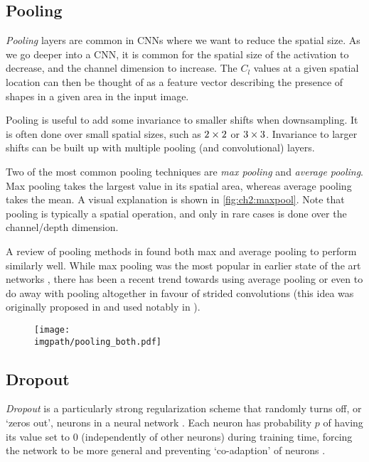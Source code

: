 \subsection{Pooling}
\emph{Pooling} layers are common in CNNs where we want to reduce the spatial size. As
we go deeper into a CNN, it is common for the spatial size of the activation to
decrease, and the channel dimension to increase. The $C_l$ values at a given
spatial location can then be thought of as a feature vector describing the
presence of shapes in a given area in the input image.

Pooling is useful to add some invariance to smaller shifts when downsampling. It
is often done over small spatial sizes, such as $2\times 2$ or $3\times 3$. Invariance
to larger shifts can be built up with multiple pooling (and convolutional) layers.

Two of the most common pooling techniques are \emph{max pooling} and
\emph{average pooling}. Max pooling takes the largest value in its spatial area,
whereas average pooling takes the mean. A visual explanation is shown in 
\autoref{fig:ch2:maxpool}. Note that pooling is typically a spatial operation,
and only in rare cases is done over the channel/depth dimension.

A review of pooling methods in \cite{mishkin_systematic_2016} found both
max and average pooling to perform similarly well. While max pooling was the most
popular in earlier state of the art networks \cite{krizhevsky_imagenet_2012,
simonyan_very_2014}, there has been a recent trend towards using average pooling
\cite{huang_densely_2017} or even to do away with pooling altogether in favour
of strided convolutions (this idea was originally proposed in
\cite{springenberg_striving_2014-3} and used notably in \cite{he_deep_2016,
xie_aggregated_2017, zagoruyko_wide_2016-1}).
  
\begin{figure}
  \centering
  \texttt{[image: \\imgpath/pooling\_both.pdf]}
  \label{fig:ch2:maxpool}
\end{figure}

\subsection{Dropout}
\emph{Dropout} is a particularly strong regularization scheme that randomly turns off,
or `zeros out', neurons in a neural network \cite{hinton_improving_2012, srivastava_dropout:_2014}.
Each neuron has probability $p$ of having its value set to 0 (independently of
other neurons) during training
time, forcing the network to be more general and preventing `co-adaption' of
neurons \cite{srivastava_dropout:_2014}.

